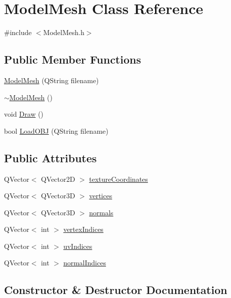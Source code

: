 \hypertarget{class_model_mesh}{}\section{Model\+Mesh Class Reference}
\label{class_model_mesh}


{\ttfamily \#include $<$Model\+Mesh.\+h$>$}

\subsection*{Public Member Functions}
\begin{DoxyCompactItemize}
\item 
\hyperlink{class_model_mesh_a66cb08339912d0762fa09102a44b7c95}{Model\+Mesh} (Q\+String filename)
\item 
\hyperlink{class_model_mesh_ac55ceaeaf68d3afee13bc41942c7454c}{$\sim$\+Model\+Mesh} ()
\item 
void \hyperlink{class_model_mesh_afc2d787ab647dd3f9a4aa1726bc02579}{Draw} ()
\item 
bool \hyperlink{class_model_mesh_aee64188b87b0b0ca4e1487a17b18d191}{Load\+O\+B\+J} (Q\+String filename)
\end{DoxyCompactItemize}
\subsection*{Public Attributes}
\begin{DoxyCompactItemize}
\item 
Q\+Vector$<$ Q\+Vector2\+D $>$ \hyperlink{class_model_mesh_a39b5f3198d521fbe40934d044348f039}{texture\+Coordinates}
\item 
Q\+Vector$<$ Q\+Vector3\+D $>$ \hyperlink{class_model_mesh_a025988c601aaf8c42d5f1a7ff75c9f40}{vertices}
\item 
Q\+Vector$<$ Q\+Vector3\+D $>$ \hyperlink{class_model_mesh_a94dc6f2853c9e2364e25e1cf34d09ed5}{normals}
\item 
Q\+Vector$<$ int $>$ \hyperlink{class_model_mesh_acfba0ca825dfe69c518f3ba9ce600965}{vertex\+Indices}
\item 
Q\+Vector$<$ int $>$ \hyperlink{class_model_mesh_a11bdfe8b89a8edc92ffb913e68ad809b}{uv\+Indices}
\item 
Q\+Vector$<$ int $>$ \hyperlink{class_model_mesh_af1db5566f88f9fca06da8df558b59949}{normal\+Indices}
\end{DoxyCompactItemize}


\subsection{Constructor \& Destructor Documentation}
\hypertarget{class_model_mesh_a66cb08339912d0762fa09102a44b7c95}{}
